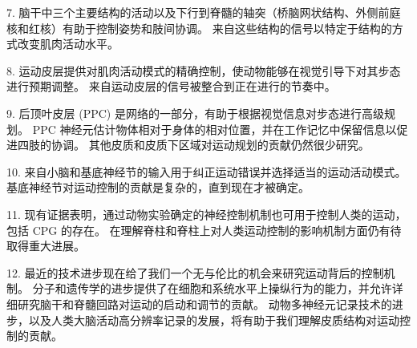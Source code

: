 7. 脑干中三个主要结构的活动以及下行到脊髓的轴突（桥脑网状结构、外侧前庭核和红核）有助于控制姿势和肢间协调。 来自这些结构的信号以特定于结构的方式改变肌肉活动水平。


8. 运动皮层提供对肌肉活动模式的精确控制，使动物能够在视觉引导下对其步态进行预期调整。
来自运动皮层的信号被整合到正在进行的节奏中。


9. 后顶叶皮层 (PPC) 是网络的一部分，有助于根据视觉信息对步态进行高级规划。
PPC 神经元估计物体相对于身体的相对位置，并在工作记忆中保留信息以促进四肢的协调。 其他皮质和皮质下区域对运动规划的贡献仍然很少研究。


10. 来自小脑和基底神经节的输入用于纠正运动错误并选择适当的运动活动模式。
基底神经节对运动控制的贡献是复杂的，直到现在才被确定。


11. 现有证据表明，通过动物实验确定的神经控制机制也可用于控制人类的运动，包括 CPG 的存在。
在理解脊柱和脊柱上对人类运动控制的影响机制方面仍有待取得重大进展。


12. 最近的技术进步现在给了我们一个无与伦比的机会来研究运动背后的控制机制。
分子和遗传学的进步提供了在细胞和系统水平上操纵行为的能力，并允许详细研究脑干和脊髓回路对运动的启动和调节的贡献。
动物多神经元记录技术的进步，以及人类大脑活动高分辨率记录的发展，将有助于我们理解皮质结构对运动控制的贡献。

